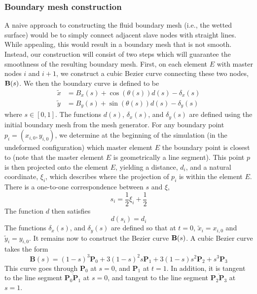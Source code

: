 \documentclass{article}
\begin{document}
\subsubsection{Boundary mesh construction}
A naive approach to constructing the fluid boundary mesh (i.e., the wetted surface) would be to simply connect adjacent slave nodes with straight lines.
While appealing, this would result in a boundary mesh that is not smooth.
Instead, our construction will consist of two steps which will guarantee the smoothness of the resulting boundary mesh.
First, on each element $E$ with master nodes $i$ and $i+1$,  we construct a cubic Bezier curve connecting these two nodes, ${\bf B}(s)$.  
We then the boundary curve is defined to be
\begin{subequations}
\label{equations3}
\begin{align}
  \label{eq:eq11100a}
  \tilde{x} &= B_x(s) + \cos{(\theta(s))} d(s) - \delta_x(s)  \\
  \label{eq:eq11100b}
  \tilde{y} &= B_y(s) + \sin{(\theta(s))} d(s) - \delta_y(s) 
\end{align}
\end{subequations}
where $s \in [0,1]$.
The functions $d(s)$, $\delta_x(s)$, and $\delta_y(s)$ are defined using the initial boundary mesh from the mesh generator.
For any boundary point $p_i = (x_{i,0},y_{i,0})$, we determine at the beginning of the simulation (in the undeformed configuration) which master element $E$ the boundary point is closest to (note that the master element $E$ is geometrically a line segment).
This point $p$ is then projected onto the element $E$, yielding a distance, $d_i$, and a natural coordinate, $\xi_i$, which describes where the projection of $p_i$ is within the element $E$.
There is a one-to-one correspondence between $s$ and $\xi$,
\[ s_i = \frac{1}{2}\xi_i + \frac{1}{2} \]
The function $d$ then satisfies
\[ d(s_i) = d_i \]
The functions $\delta_x(s)$, and $\delta_y(s)$ are defined so that at $t=0$, $\tilde{x}_i = x_{i,0}$ and  $\tilde{y}_i = y_{i,0}$.
It remains now to construct the Bezier curve  ${\bf B}(s)$. 
A cubic Bezier curve takes the form
\begin{equation} \mathbf{B}(s) = (1-s)^3\mathbf{P}_0 + 3(1-s)^2s\mathbf{P}_1 + 3(1-s)s^2\mathbf{P}_2+s^3\mathbf{P}_3 \label{eq:eq10300} \end{equation}
This curve goes through $\mathbf{P}_0$ at $s=0$, and $\mathbf{P}_1$ at $t=1$. 
In addition, it is tangent to the line segment $\overline{\mathbf{P}_0\mathbf{P}_1}$ at $s=0$, and tangent to the line segment $\overline{\mathbf{P}_2\mathbf{P}_3}$ at $s=1$.
\end{document}
